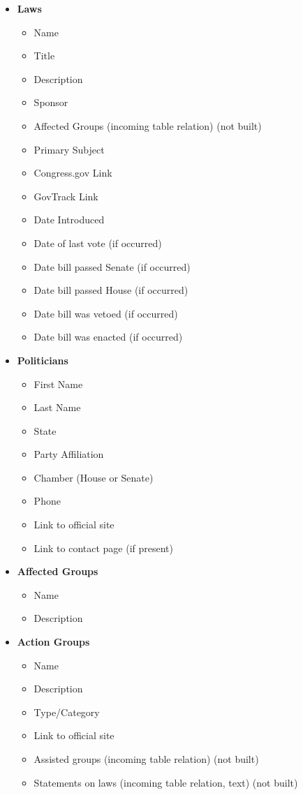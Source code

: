 \documentclass[12pt]{article}
\begin{document}
\begin{itemize}[label=]
	\item\textbf{Laws}
	\begin{itemize}
		\item Name
		\item Title
		\item Description
		\item Sponsor
		\item Affected Groups (incoming table relation) (not built)
		\item Primary Subject
		\item Congress.gov Link
		\item GovTrack Link
		\item Date Introduced
		\item Date of last vote  (if occurred)
		\item Date bill passed Senate (if occurred)
		\item Date bill passed House (if occurred)
		\item Date bill was vetoed (if occurred)
		\item Date bill was enacted  (if occurred)
	\end{itemize}
	\item\textbf{Politicians}
	\begin{itemize}
		\item First Name
		\item Last Name
		\item State
		\item Party Affiliation
		\item Chamber (House or Senate)
		\item Phone
		\item Link to official site
		\item Link to contact page (if present)
	\end{itemize}
	\item\textbf{Affected Groups}
	\begin{itemize}
		\item Name
		\item Description
	\end{itemize}
	\item\textbf{Action Groups}
	\begin{itemize}
		\item Name
		\item Description
		\item Type/Category
		\item Link to official site
		\item Assisted groups (incoming table relation) (not built)
		\item Statements on laws (incoming table relation, text) (not built)
	\end{itemize}
\end{itemize}
\end{document}
